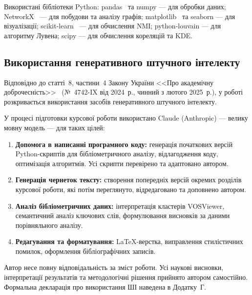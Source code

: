 Використані бібліотеки Python: pandas~\cite{McKinney2010} та numpy --- для обробки даних; NetworkX~\cite{Hagberg2008} --- для побудови та аналізу графів; matplotlib~\cite{Hunter2007} та seaborn --- для візуалізації; scikit-learn~\cite{Pedregosa2011} --- для обчислення NMI; python-louvain --- для алгоритму Лувена; scipy --- для обчислення кореляцій та KDE.

\subsection{Використання генеративного штучного інтелекту}
\label{sec:genai}

Відповідно до статті~8, частини~4 Закону України <<Про академічну доброчесність>>~\cite{AkademichnaDobrochesnist2024} (№~4742-IX від 2024~р., чинний з лютого 2025~р.), у роботі розкривається використання засобів генеративного штучного інтелекту.

У процесі підготовки курсової роботи використано Claude (Anthropic) --- велику мовну модель --- для таких цілей:

\begin{enumerate}
    \item \textbf{Допомога в написанні програмного коду:} генерація початкових версій Python-скриптів для бібліометричного аналізу, відлагодження коду, оптимізація алгоритмів. Усі скрипти перевірено та адаптовано автором.
    \item \textbf{Генерація чернеток тексту:} створення попередніх версій окремих розділів курсової роботи, які потім переглянуто, відредаговано та доповнено автором.
    \item \textbf{Аналіз бібліометричних даних:} інтерпретація кластерів VOSViewer, семантичний аналіз ключових слів, формулювання висновків за даними порівняльного аналізу.
    \item \textbf{Редагування та форматування:} LaTeX-верстка, виправлення стилістичних помилок, оформлення бібліографічних записів.
\end{enumerate}

Автор несе повну відповідальність за зміст роботи. Усі наукові висновки, інтерпретації результатів та методологічні рішення прийнято автором самостійно. Формальна декларація про використання ШІ наведена в Додатку~Г.
